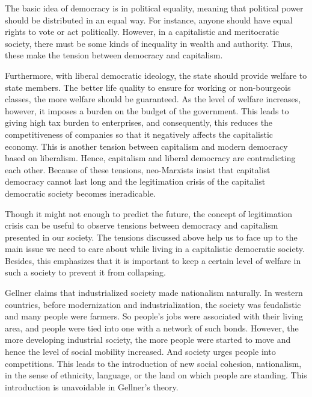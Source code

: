 \documentclass{homework}
\begin{document}
\newpage


The basic idea of democracy is in political equality, meaning that political power should be distributed in an equal way. For instance, anyone should have equal rights to vote or act politically. However, in a capitalistic and meritocratic society, there must be some kinds of inequality in wealth and authority. Thus, these make the tension between democracy and capitalism.

Furthermore, with liberal democratic ideology, the state should provide welfare to state members. The better life quality to ensure for working or non-bourgeois classes, the more welfare should be guaranteed. As the level of welfare increases, however, it imposes a burden on the budget of the government. This leads to giving high tax burden to enterprises, and consequently, this reduces the competitiveness of companies so that it negatively affects the capitalistic economy. This is another tension between capitalism and modern democracy based on liberalism. Hence, capitalism and liberal democracy are contradicting each other. Because of these tensions, neo-Marxists insist that capitalist democracy cannot last long and the legitimation crisis of the capitalist democratic society becomes ineradicable.

Though it might not enough to predict the future, the concept of legitimation crisis can be useful to observe tensions between democracy and capitalism presented in our society. The tensions discussed above help us to face up to the main issue we need to care about while living in a capitalistic democratic society. Besides, this emphasizes that it is important to keep a certain level of welfare in such a society to prevent it from collapsing. 


\newpage


Gellner claims that industrialized society made nationalism naturally. In western countries, before modernization and industrialization, the society was feudalistic and many people were farmers. So people's jobs were associated with their living area, and people were tied into one with a network of such bonds. However, the more developing industrial society, the more people were started to move and hence the level of social mobility increased. And society urges people into competitions. This leads to the introduction of new social cohesion, nationalism, in the sense of ethnicity, language, or the land on which people are standing. This introduction is unavoidable in Gellner's theory.
\end{document}
